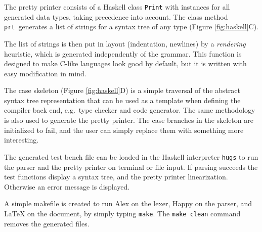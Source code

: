 
The pretty printer consists of a Haskell class {\tt Print} with instances
for all generated data types, taking precedence into account. The class method
{\tt prt}\
generates a list of strings for a syntax tree of any type (Figure \ref{fig:haskell}C).

The list of strings is then put in layout (indentation, newlines) by a \textit{rendering}
heuristic, which is generated independently of the grammar. This function is designed to make C-like languages look good by default, but it is written with easy modification in mind.

The case skeleton (Figure \ref{fig:haskell}D) is a simple traversal of the abstract syntax tree representation that can be used as a template when defining the compiler
back end, e.g.\ type checker and code generator. The same methodology is
also used to generate the pretty printer. The case branches in the skeleton
are initialized to fail, and the user can simply replace them with something more interesting.


The generated test bench file can be loaded in the Haskell interpreter \texttt{hugs} to
run the parser and the pretty printer on terminal or file input.
If parsing succeeds the test functions display a syntax tree,
and the pretty printer linearization. Otherwise an error message is displayed.

A simple makefile is created to run Alex on the lexer, Happy on the parser, and
LaTeX on the document, by simply typing {\tt make}. The {\tt make clean}
command removes the generated files.


